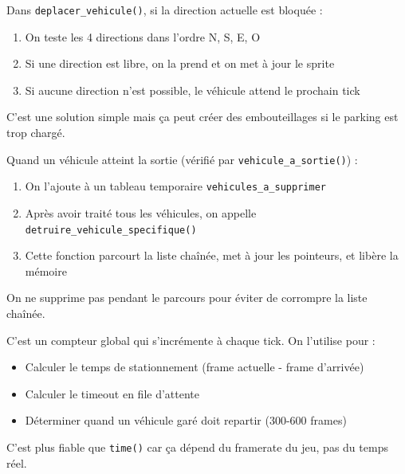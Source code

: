 \documentclass[11pt,a4paper]{article}
\newcommand{\code}[1]{\texttt{\textcolor{accent}{#1}}}
\begin{document}
\begin{questionbox}
\end{questionbox}

\begin{reponsebox}
Dans \code{deplacer\_vehicule()}, si la direction actuelle est bloquée :
\begin{enumerate}[noitemsep]
    \item On teste les 4 directions dans l'ordre N, S, E, O
    \item Si une direction est libre, on la prend et on met à jour le sprite
    \item Si aucune direction n'est possible, le véhicule attend le prochain tick
\end{enumerate}
C'est une solution simple mais ça peut créer des embouteillages si le parking est trop chargé.
\end{reponsebox}

\vspace{0.3cm}

\begin{questionbox}
\end{questionbox}

\begin{reponsebox}
Quand un véhicule atteint la sortie (vérifié par \code{vehicule\_a\_sortie()}) :
\begin{enumerate}[noitemsep]
    \item On l'ajoute à un tableau temporaire \code{vehicules\_a\_supprimer}
    \item Après avoir traité tous les véhicules, on appelle \code{detruire\_vehicule\_specifique()}
    \item Cette fonction parcourt la liste chaînée, met à jour les pointeurs, et libère la mémoire
\end{enumerate}
On ne supprime pas pendant le parcours pour éviter de corrompre la liste chaînée.
\end{reponsebox}

\vspace{0.3cm}

\begin{questionbox}
\end{questionbox}

\begin{reponsebox}
C'est un compteur global qui s'incrémente à chaque tick. On l'utilise pour :
\begin{itemize}[noitemsep]
    \item Calculer le temps de stationnement (frame actuelle - frame d'arrivée)
    \item Calculer le timeout en file d'attente
    \item Déterminer quand un véhicule garé doit repartir (300-600 frames)
\end{itemize}
C'est plus fiable que \code{time()} car ça dépend du framerate du jeu, pas du temps réel.
\end{reponsebox}
\end{document}
